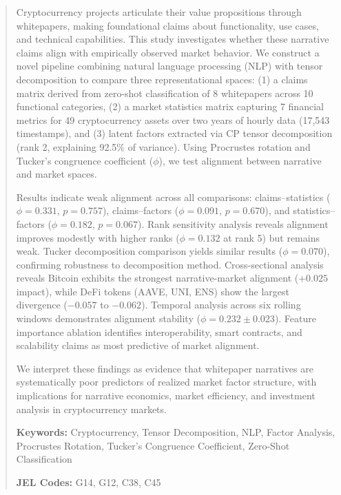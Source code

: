 \documentclass[11pt,twocolumn]{article}
\begin{document}
\begin{abstract}
\noindent Cryptocurrency projects articulate their value propositions through whitepapers, making foundational claims about functionality, use cases, and technical capabilities. This study investigates whether these narrative claims align with empirically observed market behavior. We construct a novel pipeline combining natural language processing (NLP) with tensor decomposition to compare three representational spaces: (1) a claims matrix derived from zero-shot classification of 8 whitepapers across 10 functional categories, (2) a market statistics matrix capturing 7 financial metrics for 49 cryptocurrency assets over two years of hourly data (17,543 timestamps), and (3) latent factors extracted via CP tensor decomposition (rank 2, explaining 92.5\% of variance). Using Procrustes rotation and Tucker's congruence coefficient ($\phi$), we test alignment between narrative and market spaces.

Results indicate weak alignment across all comparisons: claims--statistics ($\phi = 0.331$, $p = 0.757$), claims--factors ($\phi = 0.091$, $p = 0.670$), and statistics--factors ($\phi = 0.182$, $p = 0.067$). Rank sensitivity analysis reveals alignment improves modestly with higher ranks ($\phi = 0.132$ at rank 5) but remains weak. Tucker decomposition comparison yields similar results ($\phi = 0.070$), confirming robustness to decomposition method. Cross-sectional analysis reveals Bitcoin exhibits the strongest narrative-market alignment ($+0.025$ impact), while DeFi tokens (AAVE, UNI, ENS) show the largest divergence ($-0.057$ to $-0.062$). Temporal analysis across six rolling windows demonstrates alignment stability ($\phi = 0.232 \pm 0.023$). Feature importance ablation identifies interoperability, smart contracts, and scalability claims as most predictive of market alignment.

We interpret these findings as evidence that whitepaper narratives are systematically poor predictors of realized market factor structure, with implications for narrative economics, market efficiency, and investment analysis in cryptocurrency markets.

\vspace{0.5em}
\noindent\textbf{Keywords:} Cryptocurrency, Tensor Decomposition, NLP, Factor Analysis, Procrustes Rotation, Tucker's Congruence Coefficient, Zero-Shot Classification

\vspace{0.3em}
\noindent\textbf{JEL Codes:} G14, G12, C38, C45
\end{abstract}
\end{document}
